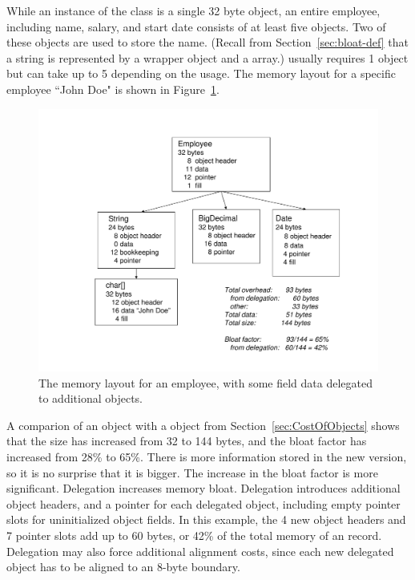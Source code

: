 While an instance of the  class is a single 32
byte object, an entire employee, including name, salary, and start date
consists of at least five objects. Two of these objects
are used to store the name. (Recall from Section~\ref{sec:bloat-def} that a string is represented by a
wrapper  object and a  array.) 
usually requires 1 object but can take up to 5 depending on the usage.
The memory layout for a specific employee ``John Doe" is shown in Figure~\ref{fig:employee-status}.
 \begin{figure}
  \centering
 \includegraphics[width=.80\textwidth]{part1/Figures/modelingdatatypes/employee-status.pdf}
  \caption{The memory layout for an employee, with some field data
  delegated to additional objects.}
  \label{fig:employee-status}
\end{figure}

A comparion of an  object with a
 object from Section~\ref{sec:CostOfObjects} shows that
the size has increased from 32 to 144 bytes, and the bloat factor has increased
from 28\% to 65\%.
There is more information stored in the new version, so it is no surprise that it is bigger. The increase
in the bloat factor is more significant. Delegation increases memory bloat. Delegation introduces additional
object headers, and a pointer for each delegated object, including empty
pointer slots for uninitialized object fields. In this example, the
4 new object headers and 7 pointer slots add up to 60 bytes, or
42\% of the total memory of an  record. Delegation may also
force additional alignment costs, since each new delegated object has to be aligned
to an 8-byte boundary.

